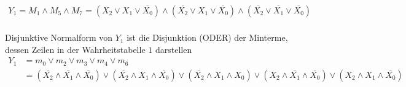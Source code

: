 \documentclass[]{article}
\newcommand{\V}{\lor}
\newcommand{\A}{\land}
\newcommand{\T}[1]{\overline{#1}}
\begin{document}
	\begin{align*}
	Y_1 = M_1 \A M_5 \A M_7 =
		(X_2 \V     X_1 \V \T{X_0}) \A    %
		(    \T{X_2} \V     X_1 \V \T{X_0}) \A  %
		(   \T{X_2} \V \T{X_1} \V \T{X_0})\\    %
	\end{align*}

	Disjunktive Normalform von $Y_1$ ist die Disjunktion (ODER) der Minterme, dessen Zeilen in der Wahrheitstabelle $1$ darstellen\\

	\begin{align*}
		Y_1 &= m_0 \V m_2 \V m_3 \V m_4 \V m_6\\
		&=
		(\T{X_2} \A \T{X_1} \A \T{X_0}) \V
		(\T{X_2} \A     X_1 \A \T{X_0}) \V
		(\T{X_2} \A     X_1 \A    X_0) \V
		(    X_2 \A \T{X_1} \A \T{X_0}) \V
		(    X_2 \A     X_1 \A \T{X_0})
	\end{align*}
\end{document}
